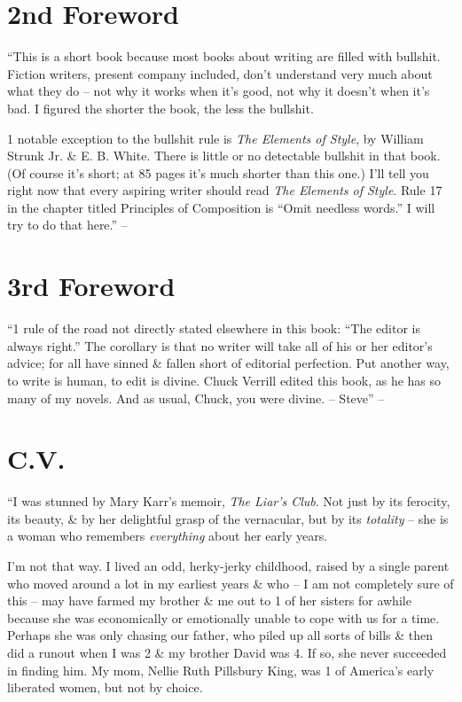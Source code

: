 \documentclass{article}
\numberwithin{equation}{section}
\begin{document}

\section*{2nd Foreword}
``This is a short book because most books about writing are filled with bullshit. Fiction writers, present company included, don't understand very much about what they do -- not why it works when it's good, not why it doesn't when it's bad. I figured the shorter the book, the less the bullshit.

1 notable exception to the bullshit rule is \textit{The Elements of Style}, by William Strunk Jr. \& E. B. White. There is little or no detectable bullshit in that book. (Of course it's short; at 85 pages it's much shorter than this one.) I'll tell you right now that every aspiring writer should read \textit{The Elements of Style}. Rule 17 in the chapter titled Principles of Composition is ``Omit needless words.'' I will try to do that here.'' -- \cite[p. 10]{King2010}


\section*{3rd Foreword}
``1 rule of the road not directly stated elsewhere in this book: ``The editor is always right.'' The corollary is that no writer will take all of his or her editor's advice; for all have sinned \& fallen short of editorial perfection. Put another way, to write is human, to edit is divine. Chuck Verrill edited this book, as he has so many of my novels. And as usual, Chuck, you were divine. -- Steve'' -- \cite[p. 11]{King2010}


\section{C.V.}
``I was stunned by Mary Karr's memoir, \textit{The Liar's Club}. Not just by its ferocity, its beauty, \& by her delightful grasp of the vernacular, but by its \textit{totality} -- she is a woman who remembers \textit{everything} about her early years.

I'm not that way. I lived an odd, herky-jerky childhood, raised by a single parent who moved around a lot in my earliest years \& who -- I am not completely sure of this -- may have farmed my brother \& me out to 1 of her sisters for awhile because she was economically or emotionally unable to cope with us for a time. Perhaps she was only chasing our father, who piled up all sorts of bills \& then did a runout when I was 2 \& my brother David was 4. If so, she never succeeded in finding him. My mom, Nellie Ruth Pillsbury King, was 1 of America's early liberated women, but not by choice.
\end{document}

